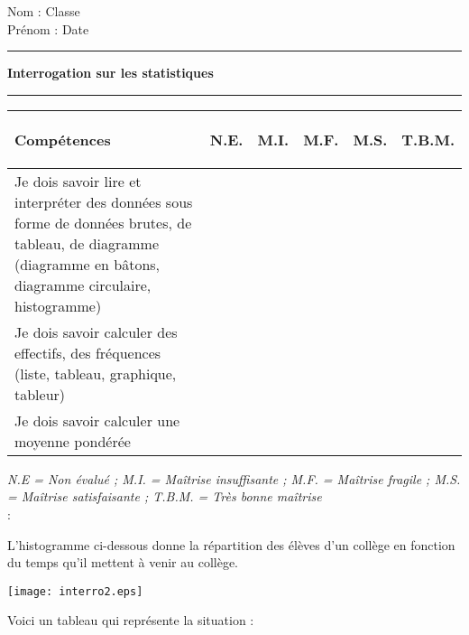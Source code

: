\documentclass[a4paper,11pt]{article}
\newcounter{numexo}
\newcommand{\exo}[1]{\stepcounter{numexo}\noindent{\bf Exercice~\thenumexo} : \marginpar{\hfill /#1}}
\newcommand{\titre}[5] 
{
\noindent #2 \hfill #4 \\
#3 \hfill #5

\vspace{-1.6cm}

\begin{center}\rule{6cm}{0.5mm}\end{center}
\vspace{0.2cm}
\begin{center}{\large{\textbf{#1}}}\end{center}
\begin{center}\rule{6cm}{0.5mm}\end{center}
}
\begin{document}
\pagestyle{empty}
\titre{Interrogation sur les statistiques}{Nom :}{Prénom :}{Classe}{Date}

\begin{flushleft}
\begin{tabular}{|m{9.5cm}|m{1.25cm}|m{1.25cm}|m{1.25cm}|m{1.25cm}|m{1.25cm}|}
\hline 
\textbf{Compétences} & \begin{center}
\textbf{N.E.}
\end{center} & \begin{center}
\textbf{M.I.}
\end{center} & \begin{center}
\textbf{M.F.}
\end{center}  & \begin{center}
\textbf{M.S.}
\end{center} & \begin{center}
\textbf{T.B.M.}
\end{center} \\ 
\hline 
Je dois savoir  lire et interpréter des données sous forme de données brutes, de tableau, de diagramme (diagramme en bâtons, diagramme circulaire, histogramme) &  &  & & &\\
\hline 
Je dois savoir calculer des effectifs, des fréquences (liste, tableau, graphique, tableur) &  &  & & &\\
\hline
Je dois savoir calculer une moyenne pondérée &  &  & & &\\
\hline
\end{tabular} 
\end{flushleft}

\textit{N.E = Non évalué ; M.I. = Maîtrise insuffisante ; M.F. = Maîtrise fragile ; M.S. = Maîtrise satisfaisante ; T.B.M. = Très bonne maîtrise}\\

\exo{8}

L'histogramme ci-dessous donne la répartition des élèves d'un collège en fonction du temps qu'il mettent à venir au collège.

\begin{center}
\texttt{[image: interro2.eps]} 
\end{center}

Voici un tableau qui représente la situation :\\

\renewcommand{\arraystretch}{2}
\end{document}
